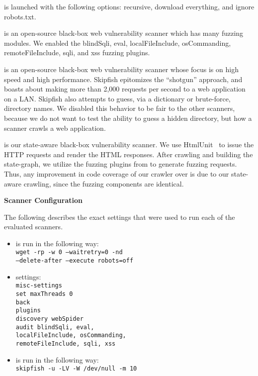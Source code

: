 \wget{} is launched with the following options: recursive, download everything, and
ignore robots.txt. 

\noindent \textbf{\waf{}} is an open-source black-box web vulnerability
scanner which has many fuzzing modules. We enabled the blindSqli, eval,
localFileInclude, osCommanding, remoteFileInclude, sqli, and xss fuzzing plugins.

\noindent \textbf{\skipfish{}} is an open-source black-box web vulnerability
scanner whose focus is on high speed and high performance. Skipfish epitomizes
the ``shotgun'' approach, and boasts about making more than 2,000 requests per
second to a web application on a LAN. Skipfish also attempts to guess, via a
dictionary or brute-force, directory names. We disabled this behavior
to be fair to the other scanners, because we do not want to test the ability to
guess a hidden directory, but how a scanner crawls a web
application.

\noindent \textbf{\crawler{}} is our state-aware black-box vulnerability
scanner. We use HtmlUnit~\cite{htmlunit} to issue the HTTP requests and render
the HTML responses. After crawling and building the state-graph, we utilize the
fuzzing plugins from \waf{} to generate fuzzing requests. Thus, any improvement
in code coverage of our crawler over \waf{} is due to our state-aware crawling,
since the fuzzing components are identical.


\noindent \textbf{Scanner Configuration}

The following describes the exact settings that were used to run each of the
evaluated scanners.

\begin{itemize}
\item \wget{} is run in the following way: \\
\texttt{wget -rp -w 0 --waitretry=0 -nd \\
\phantom{MM}--delete-after  --execute robots=off}

\item \waf{} settings: \\
\texttt{misc-settings  \\
set maxThreads 0 \\
back \\
plugins \\
discovery webSpider \\
audit blindSqli, eval, \\
\phantom{MM}localFileInclude, osCommanding, \\
\phantom{MM}remoteFileInclude, sqli, xss 
}

\item \skipfish{} is run in the following way: \\
\texttt{skipfish -u -LV -W /dev/null -m 10}
\end{itemize}

